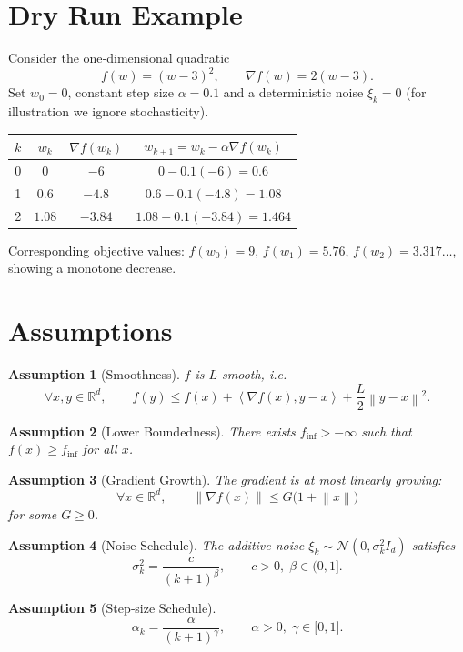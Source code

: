 \documentclass[11pt]{article}
\newtheorem{assumption}{Assumption}
\newcommand{\R}{\mathbb{R}}
\newcommand{\norm}[1]{\left\|#1\right\|}
\newcommand{\ip}[2]{\left\langle #1,#2\right\rangle}
\begin{document}
\section*{Dry Run Example}
Consider the one‑dimensional quadratic
\[
f(w)=(w-3)^2,\qquad \nabla f(w)=2(w-3).
\]
Set $w_0=0$, constant step size $\alpha=0.1$ and a deterministic
noise $\xi_k=0$ (for illustration we ignore stochasticity).  

\begin{center}
\begin{tabular}{c|c|c|c}
$k$ & $w_k$ & $\nabla f(w_k)$ & $w_{k+1}=w_k-\alpha\nabla f(w_k)$ \\ \hline
0 & $0$ & $-6$ & $0-0.1(-6)=0.6$ \\
1 & $0.6$ & $-4.8$ & $0.6-0.1(-4.8)=1.08$ \\
2 & $1.08$ & $-3.84$ & $1.08-0.1(-3.84)=1.464$ \\
\end{tabular}
\end{center}
Corresponding objective values:
$f(w_0)=9$, $f(w_1)=5.76$, $f(w_2)=3.317\ldots$,
showing a monotone decrease.

\section*{Assumptions}
\begin{assumption}[Smoothness]\label{ass:smooth}
$f$ is $L$‑smooth, i.e.
\[
\forall x,y\in\R^d,\qquad 
f(y)\le f(x)+\ip{\nabla f(x)}{y-x}+\frac{L}{2}\norm{y-x}^2 .
\tag{2}
\]
\end{assumption}
\begin{assumption}[Lower Boundedness]\label{ass:lower}
There exists $f_{\inf}>-\infty$ such that $f(x)\ge f_{\inf}$ for all $x$.
\end{assumption}
\begin{assumption}[Gradient Growth]\label{ass:gradbound}
The gradient is at most linearly growing:
\[
\forall x\in\R^d,\qquad \norm{\nabla f(x)}\le G\bigl(1+\norm{x}\bigr)
\tag{3}
\]
for some $G\ge0$.
\end{assumption}
\begin{assumption}[Noise Schedule]\label{ass:noise}
The additive noise $\xi_k\sim\mathcal N(0,\sigma_k^2 I_d)$ satisfies
\[
\sigma_k^2 = \frac{c}{(k+1)^{\beta}},\qquad c>0,\;\beta\in (0,1].
\tag{4}
\]
\end{assumption}
\begin{assumption}[Step‑size Schedule]\label{ass:stepsize}
\[
\alpha_k = \frac{\alpha}{(k+1)^{\gamma}},\qquad
\alpha>0,\;\gamma\in\bigl[0,1\bigr].
\tag{5}
\]
\end{assumption}
\end{document}

